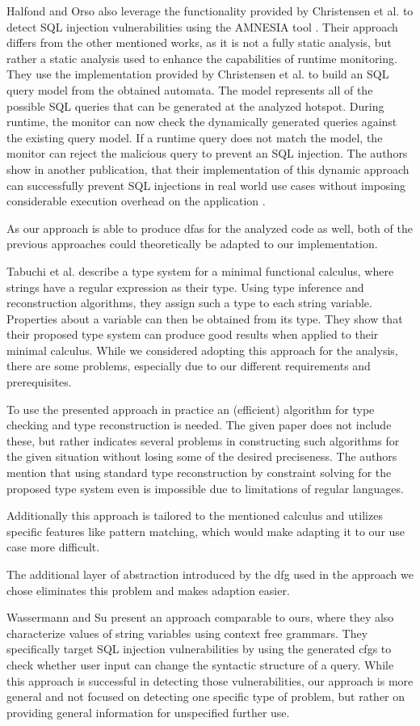 Halfond and Orso also leverage the functionality provided by Christensen et al. to detect SQL injection vulnerabilities using the AMNESIA tool \cite{amnesia}. Their approach differs from the other mentioned works, as it is not a fully static analysis, but rather a static analysis used to enhance the capabilities of runtime monitoring. They use the implementation provided by Christensen et al. to build an SQL query model from the obtained automata. The model represents all of the possible SQL queries that can be generated at the analyzed hotspot.
During runtime, the monitor can now check the dynamically generated queries against the existing query model. If a runtime query does not match the model, the monitor can reject the malicious query to prevent an SQL injection. The authors show in another publication, that their implementation of this dynamic approach can successfully prevent SQL injections in real world use cases without imposing considerable execution overhead on the application \cite{amnesia_evaluation}.

As our approach is able to produce \acp{dfa} for the analyzed code as well, both of the previous approaches could theoretically be adapted to our implementation.

Tabuchi et al. \cite{regex_types} describe a type system for a minimal functional calculus, where strings have a regular expression as their type. Using type inference and reconstruction algorithms, they assign such a type to each string variable. Properties about a variable can then be obtained from its type.
They show that their proposed type system can produce good results when applied to their minimal calculus. While we considered adopting this approach for the analysis, there are some problems, especially due to our different requirements and prerequisites. 

To use the presented approach in practice an (efficient) algorithm for type checking and type reconstruction is needed. 
The given paper does not include these, but rather indicates several problems in constructing such algorithms for the given situation without losing some of the desired preciseness.
The authors mention that using standard type reconstruction by constraint solving for the proposed type system even is impossible due to limitations of regular languages.

Additionally this approach is tailored to the mentioned calculus and utilizes specific features like pattern matching, which would make adapting it to our use case more difficult.

The additional layer of abstraction introduced by the \ac{dfg} used in the approach we chose eliminates this problem and makes adaption easier.

Wassermann and Su \cite{sqli_wassermann_su} present an approach comparable to ours, where they also characterize values of string variables using context free grammars. They specifically target SQL injection vulnerabilities by using the generated \acp{cfg} to check whether user input can change the syntactic structure of a query. While this approach is successful in detecting those vulnerabilities, our approach is more general and not focused on detecting one specific type of problem, but rather on providing general information for unspecified further use.